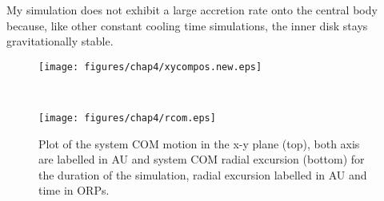 My simulation does not exhibit a large accretion rate onto the central body because, like other constant cooling time simulations, the inner disk stays gravitationally stable. 
\begin{figure}[p]
\centering
{}
\begin{minipage}[t]{6.3in}
\centering
\texttt{[image: figures/chap4/xycompos.new.eps]}
\end{minipage}\\
\begin{minipage}[t]{6.3in}
\centering
\texttt{[image: figures/chap4/rcom.eps]}
\end{minipage}
\caption[Position of the system center of mass and it's radial excursion.]{Plot of the system COM motion in the x-y plane (top), both axis are labelled in AU and system COM radial excursion (bottom) for the duration of the simulation, radial excursion labelled in AU and time in ORPs.}
\label{SMstarmotion}
\end{figure}
